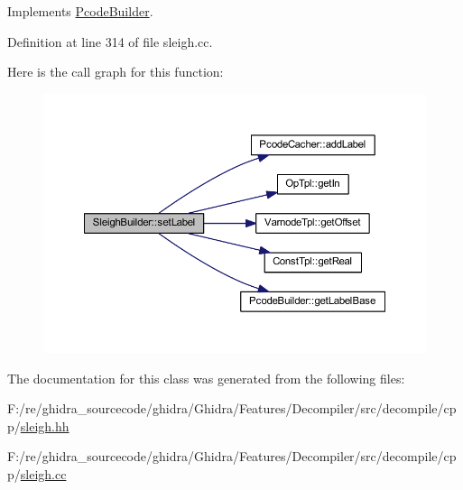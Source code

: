 Implements \mbox{\hyperlink{class_pcode_builder_aadc0f772375e7c05ecd11ea145d61df2}{Pcode\+Builder}}.



Definition at line 314 of file sleigh.\+cc.

Here is the call graph for this function\+:
\nopagebreak
\begin{figure}[H]
\begin{center}
\leavevmode
\includegraphics[width=350pt]{class_sleigh_builder_ad5b3ee580fec7e944389fb51ba798e3c_cgraph}
\end{center}
\end{figure}


The documentation for this class was generated from the following files\+:\begin{DoxyCompactItemize}
\item 
F\+:/re/ghidra\+\_\+sourcecode/ghidra/\+Ghidra/\+Features/\+Decompiler/src/decompile/cpp/\mbox{\hyperlink{sleigh_8hh}{sleigh.\+hh}}\item 
F\+:/re/ghidra\+\_\+sourcecode/ghidra/\+Ghidra/\+Features/\+Decompiler/src/decompile/cpp/\mbox{\hyperlink{sleigh_8cc}{sleigh.\+cc}}\end{DoxyCompactItemize}
